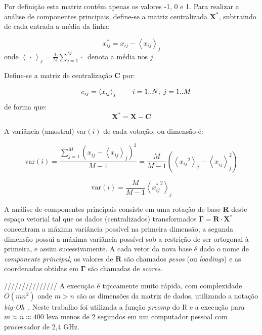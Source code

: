 \documentclass[a4paper, 12pt]{article}
\begin{document}
Por definição esta matriz contém apenas os valores -1, 0 e 1. Para realizar a análise de componentes principais, define-se a matriz centralizada $\mathbf{X^{*}}$, subtraindo de cada entrada a média da linha:

\begin{equation}
  x_{ij}^{*} = x_{ij} - \left< x_{ij} \right>_j 
  \label{eq:x-estrela}
\end{equation}
onde $\left< \,\cdot\, \right>_j = \frac{1}{M}\sum_{j=1}^{M} \cdot\,$ denota a média nos $j$.

Define-se a matriz de centralização $\mathbf{C}$ por:

\[
  \begin{array}{r r r r}
    ~ & c_{ij} = \left< x_{ij} \right>_{j} & ~ & i=1..N;\;j=1..M \\
  \end{array}
\]
de forma que:
\[
  \mathbf{X^{*}} = \mathbf{X} - \mathbf{C}
\]

A variância (amostral) var$(i)$ de cada votação, ou dimensão é:

\[
\mathrm{var}(i) = \frac{\sum_{j=1}^M \left( x_{ij} - \left< x_{ij} \right>_j \right)^2 }{M-1}
= \frac{M}{M-1}\left(\left< {x_{ij}}^{2} \right>_{j} - \left< x_{ij}^{~}\right>_{j}^{2} \right)
\]

\begin{equation}
\mathrm{var}(i) = \frac{M}{M-1}\left<{x_{ij}^{*}}^{2}\right>_{j}
\label{eq:variancia}
\end{equation}

A análise de componentes principais consiste em uma rotação de base \textbf{R} deste espaço vetorial tal que os dados (centralizados) transformados $\mathbf{\Gamma} = \mathbf{R}\cdot \mathbf{X^{*}}$ concentram a máxima variância possível na primeira dimensão, a segunda dimensão possui a máxima variância possível sob a restrição de ser ortogonal à primeira, e assim sucessivamente. A cada vetor da nova base é dado o nome de \emph{componente principal}, os valores de $\mathbf{R}$ são chamados \emph{pesos} (ou \emph{loadings}) e as coordenadas obtidas em $\mathbf{\Gamma}$ são chamadas de \emph{scores}.


///////////////
 A execução é tipicamente muito rápida, com complexidade $O(mn^2)$ onde $m>n$ são as dimensões da matriz de dados, utilizando a notação \emph{big-Oh}~\cite{golub-vanloan}. Neste trabalho foi utilizada a função \emph{prcomp} do R e a execução para $m\approx n \approx 400$ leva menos de 2 segundos em um computador pessoal com processador de 2,4 GHz.
\end{document}
